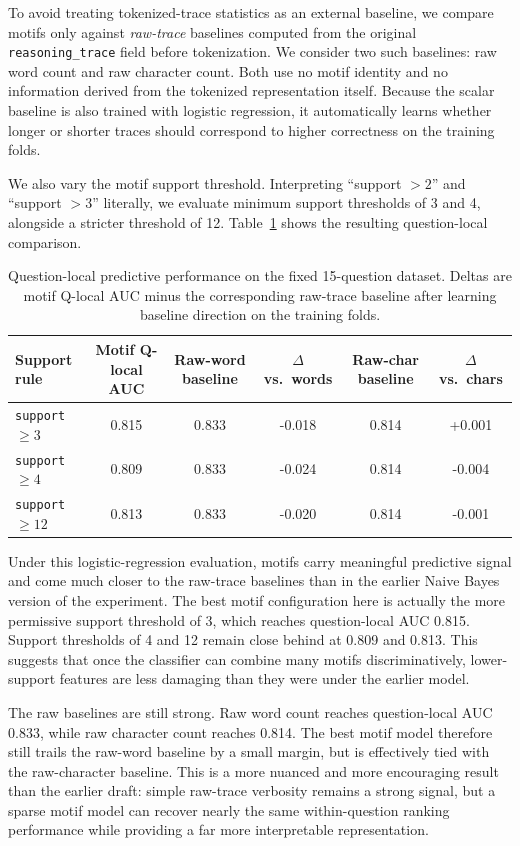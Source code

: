 \documentclass[11pt]{article}
\begin{document}
To avoid treating tokenized-trace statistics as an external baseline, we compare motifs only against \emph{raw-trace} baselines computed from the original \texttt{reasoning\_trace} field before tokenization. We consider two such baselines: raw word count and raw character count. Both use no motif identity and no information derived from the tokenized representation itself. Because the scalar baseline is also trained with logistic regression, it automatically learns whether longer or shorter traces should correspond to higher correctness on the training folds.

We also vary the motif support threshold. Interpreting ``support $>2$'' and ``support $>3$'' literally, we evaluate minimum support thresholds of 3 and 4, alongside a stricter threshold of 12. Table~\ref{tab:predictive} shows the resulting question-local comparison.

\begin{table}[h]
\centering
\small
\caption{Question-local predictive performance on the fixed 15-question dataset. Deltas are motif Q-local AUC minus the corresponding raw-trace baseline after learning baseline direction on the training folds.}
\label{tab:predictive}
\begin{tabular}{@{}lccccc@{}}
\toprule
Support rule & Motif Q-local AUC & Raw-word baseline & $\Delta$ vs.\ words & Raw-char baseline & $\Delta$ vs.\ chars \\
\midrule
\texttt{support $\geq 3$}  & 0.815 & 0.833 & -0.018 & 0.814 & +0.001 \\
\texttt{support $\geq 4$}  & 0.809 & 0.833 & -0.024 & 0.814 & -0.004 \\
\texttt{support $\geq 12$} & 0.813 & 0.833 & -0.020 & 0.814 & -0.001 \\
\bottomrule
\end{tabular}
\end{table}

Under this logistic-regression evaluation, motifs carry meaningful predictive signal and come much closer to the raw-trace baselines than in the earlier Naive Bayes version of the experiment. The best motif configuration here is actually the more permissive support threshold of 3, which reaches question-local AUC 0.815. Support thresholds of 4 and 12 remain close behind at 0.809 and 0.813. This suggests that once the classifier can combine many motifs discriminatively, lower-support features are less damaging than they were under the earlier model.

The raw baselines are still strong. Raw word count reaches question-local AUC 0.833, while raw character count reaches 0.814. The best motif model therefore still trails the raw-word baseline by a small margin, but is effectively tied with the raw-character baseline. This is a more nuanced and more encouraging result than the earlier draft: simple raw-trace verbosity remains a strong signal, but a sparse motif model can recover nearly the same within-question ranking performance while providing a far more interpretable representation.
\end{document}
